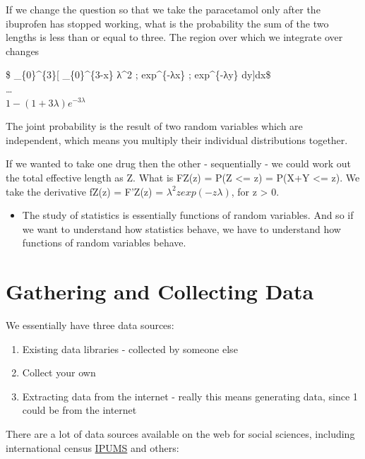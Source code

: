 \documentclass[]{book}
\providecommand{\tightlist}{%
  \setlength{\itemsep}{0pt}\setlength{\parskip}{0pt}}
\theoremstyle{definition}
\theoremstyle{definition}
\theoremstyle{definition}
\theoremstyle{remark}
\begin{document}
If we change the question so that we take the paracetamol only after the
ibuprofen has stopped working, what is the probability the sum of the
two lengths is less than or equal to three. The region over which we
integrate over changes

\$ \int\_\{0\}\^{}\{3\}{[} \int\_\{0\}\^{}\{3-x\} λ\^{}2 ;
exp\^{}\{-λx\} ; exp\^{}\{-λy\} dy{]}dx\$\\
\ldots{}\\
\(1-(1 + 3λ) e^{-3λ}\)

The joint probability is the result of two random variables which are
independent, which means you multiply their individual distributions
together.

If we wanted to take one drug then the other - sequentially - we could
work out the total effective length as Z. What is FZ(z) = P(Z
\textless{}= z) = P(X+Y \textless{}= z). We take the derivative fZ(z) =
F'Z(z) = \(λ^2zexp(- zλ)\), for z \textgreater{} 0.

\begin{itemize}
\tightlist
\item
  The study of statistics is essentially functions of random variables.
  And so if we want to understand how statistics behave, we have to
  understand how functions of random variables behave.
\end{itemize}

\section{Gathering and Collecting
Data}\label{gathering-and-collecting-data}

We essentially have three data sources:

\begin{enumerate}
\def\labelenumi{\arabic{enumi}.}
\tightlist
\item
  Existing data libraries - collected by someone else\\
\item
  Collect your own\\
\item
  Extracting data from the internet - really this means generating data,
  since 1 could be from the internet
\end{enumerate}

There are a lot of data sources available on the web for social
sciences, including international census
\href{https://international.ipums.org/international/}{IPUMS} and others:
\end{document}
